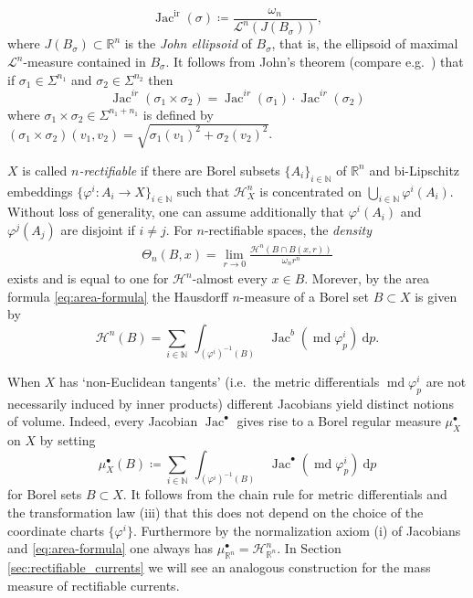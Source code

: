 \documentclass[reqno]{amsart}
\numberwithin{equation}{section}
\newcommand{\Ha}{\mathcal{H}}
\newcommand{\leb}{\mathcal{L}}
\newcommand{\Jac}{\operatorname{Jac}}
\newcommand{\md}{\operatorname{md}}
\DeclareMathOperator{\ir}{ir}
\begin{document}
\[
\Jac^{\ir}(\sigma)\coloneqq\frac{\omega_n}{\leb^n(J(B_\sigma))},
\]
where $J(B_\sigma)\subset \mathbb{R}^n$ is the \emph{John ellipsoid} of $B_\sigma$, that is, the ellipsoid of maximal $\leb^{n}$-measure contained in $B_\sigma$. It follows from John's theorem (compare e.g.\ \cite{Ball92}) that if $\sigma_1\in \Sigma^{n_1}$ and $\sigma_2\in \Sigma^{n_2}$ then 
\begin{equation}
\label{eq:ir-product}
    \Jac^{ir}(\sigma_1\times\sigma_2)=\Jac^{ir}(\sigma_1)\cdot \Jac^{ir}(\sigma_2)
\end{equation}
where $\sigma_1\times \sigma_2 \in \Sigma^{n_1+n_1}$ is defined by $(\sigma_1\times \sigma_2)(v_1,v_2)=\sqrt{\sigma_1(v_1)^2+\sigma_2(v_2)^2}$.


$X$ is called \emph{$n$-rectifiable} if there are Borel subsets $\{A_i\}_{i\in \mathbb{N}}$ of $\mathbb{R}^n$ and bi-Lipschitz embeddings $\{\varphi^i \colon A_i \to X\}_{i\in \mathbb{N}}$ such that $\mathcal{H}^n_X$ is concentrated on $\bigcup_{i\in \mathbb{N}}\varphi^i(A_i)$. Without loss of generality, one can assume additionally that $\varphi^i(A_i)$ and $\varphi^j(A_j)$ are disjoint if $i\neq j$. For $n$-rectifiable spaces, the \emph{density}
\begin{align*}
	\Theta_n(B,x)= \lim_{r\to 0}\frac{\Ha^n(B\cap B(x,r))}{ \omega_n r^n}
\end{align*}
exists and is equal to one for $\Ha^n$-almost every $x\in B$. Morever, by the area formula \eqref{eq:area-formula} the Hausdorff $n$-measure of a Borel set $B\subset X$ is given by
\begin{equation*}
\mathcal{H}^n(B)=\sum_{i\in \mathbb{N}}\ \int_{(\varphi^i)^{-1}(B)} \ \Jac^b(\md \varphi^i_p) \ \textrm{d}p.
\end{equation*}

When $X$ has `non-Euclidean tangents' (i.e.\ the metric differentials $\md \varphi_p^i $ are not necessarily induced by inner products) different Jacobians yield distinct notions of volume. Indeed, every Jacobian $\Jac^{\bullet}$ gives rise to a Borel regular measure $\mu^{\bullet}_X$ on $X$ by setting
\begin{equation}\label{eq:jac_volume}
\mu^{\bullet}_X(B)\coloneqq\sum_{i\in \mathbb{N}}\ \int_{(\varphi^i)^{-1}(B)} \ \Jac^{\bullet}(\md \varphi_p^i) \ \textrm{d}p
\end{equation}
for Borel sets $B\subset X$. It follows from the chain rule for metric differentials and the transformation law (iii) that this does not depend on the choice of the coordinate charts $\{\varphi^i\}$. Furthermore by the normalization axiom (i) of Jacobians and \eqref{eq:area-formula} one always has $\mu^{\bullet}_{\mathbb{R}^n}=\mathcal{H}^n_{\mathbb{R}^n}$. In Section \ref{sec:rectifiable_currents} we will see an analogous construction for the mass measure of rectifiable currents.
\end{document}
